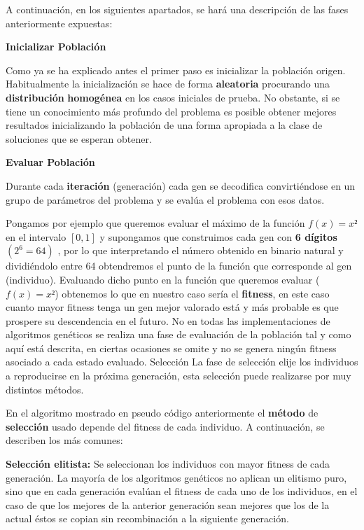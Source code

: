 \documentclass[
  a4paper,
  DIV=11,
  numbers=noendperiod]{scrreprt}
\begin{document}
A continuación, en los siguientes apartados, se hará una descripción de
las fases anteriormente expuestas:

\textbf{Inicializar Población}

Como ya se ha explicado antes el primer paso es inicializar la población
origen. Habitualmente la inicialización se hace de forma
\textbf{aleatoria} procurando una \textbf{distribución}
\textbf{homogénea} en los casos iniciales de prueba. No obstante, si se
tiene un conocimiento más profundo del problema es posible obtener
mejores resultados inicializando la población de una forma apropiada a
la clase de soluciones que se esperan obtener.

\textbf{Evaluar Población}

Durante cada \textbf{iteración} (generación) cada gen se decodifica
convirtiéndose en un grupo de parámetros del problema y se evalúa el
problema con esos datos.

Pongamos por ejemplo que queremos evaluar el máximo de la función
\(f(x)=x²\) en el intervalo \([0,1]\) y supongamos que construimos cada
gen con \textbf{6 dígitos} \((2^6=64)\) , por lo que interpretando el
número obtenido en binario natural y dividiéndolo entre 64 obtendremos
el punto de la función que corresponde al gen (individuo). Evaluando
dicho punto en la función que queremos evaluar (\(f(x)=x²\)) obtenemos
lo que en nuestro caso sería el \textbf{fitness}, en este caso cuanto
mayor fitness tenga un gen mejor valorado está y más probable es que
prospere su descendencia en el futuro. No en todas las implementaciones
de algoritmos genéticos se realiza una fase de evaluación de la
población tal y como aquí está descrita, en ciertas ocasiones se omite y
no se genera ningún fitness asociado a cada estado evaluado. Selección
La fase de selección elije los individuos a reproducirse en la próxima
generación, esta selección puede realizarse por muy distintos métodos.

En el algoritmo mostrado en pseudo código anteriormente el
\textbf{método} de \textbf{selección} usado depende del fitness de cada
individuo. A continuación, se describen los más comunes:

\textbf{Selección elitista:} Se seleccionan los individuos con mayor
fitness de cada generación. La mayoría de los algoritmos genéticos no
aplican un elitismo puro, sino que en cada generación evalúan el fitness
de cada uno de los individuos, en el caso de que los mejores de la
anterior generación sean mejores que los de la actual éstos se copian
sin recombinación a la siguiente generación.
\end{document}
